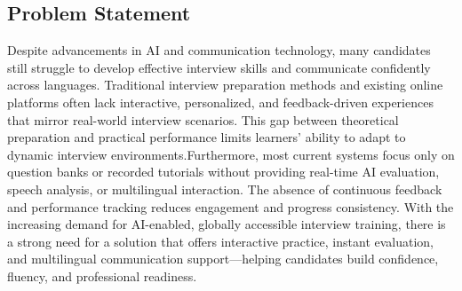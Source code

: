 \documentclass[12pt]{article}
\begin{document}
\subsection{Problem Statement}
\vspace{10pt}

Despite advancements in AI and communication technology, many candidates still struggle to develop effective interview skills and communicate confidently across languages. Traditional interview preparation methods and existing online platforms often lack interactive, personalized, and feedback-driven experiences that mirror real-world interview scenarios. This gap between theoretical preparation and practical performance limits learners’ ability to adapt to dynamic interview environments.Furthermore, most current systems focus only on question banks or recorded tutorials without providing real-time AI evaluation, speech analysis, or multilingual interaction. The absence of continuous feedback and performance tracking reduces engagement and progress consistency. With the increasing demand for AI-enabled, globally accessible interview training, there is a strong need for a solution that offers interactive practice, instant evaluation, and multilingual communication support—helping candidates build confidence, fluency, and professional readiness.
\end{document}
